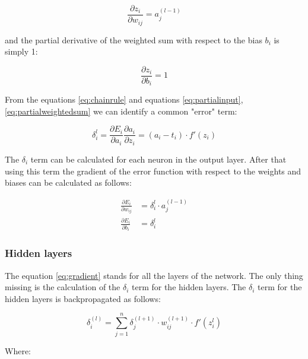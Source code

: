 \begin{equation}
    \label{eq:partialweight}
    \frac{\partial z_i}{\partial w_{ij}} = a_j^{(l-1)}
\end{equation}

and the partial derivative of the weighted sum with respect to the bias $b_i$ is simply 1:

\begin{equation}
    \label{eq:partialbias}
    \frac{\partial z_i}{\partial b_i} = 1
\end{equation}

From the equations \ref{eq:chainrule} and equations \ref{eq:partialinput}, \ref{eq:partialweightedsum} we can identify 
a common "error" term:

\begin{equation}
    \label{eq:errorterm}
    \delta_i^l =  \frac{\partial E_i}{\partial a_i} \frac{\partial a_i}{\partial z_{i}} = (a_i - t_i) \cdot f'(z_i)
\end{equation}

The $\delta_i$ term can be calculated for each neuron in the output layer. After that using this term the gradient of the
error function with respect to the weights and biases can be calculated as follows:

\begin{equation}
    \label{eq:gradient}
    \begin{split}
        \frac{\partial E_i}{\partial w_{ij}} & = \delta_i^l \cdot a_j^{(l-1)} \\
        \frac{\partial E_i}{\partial b_i} & = \delta_i^l
    \end{split}
\end{equation}

\subsubsection{Hidden layers}

The equation \ref{eq:gradient} stands for all the layers of the network. The only thing missing is the calculation of the
$\delta_i$ term for the hidden layers. The $\delta_i$ term for the hidden layers is backpropagated as follows:

\begin{equation}
    \label{eq:backpropagation}
    \delta_i^{(l)} = \sum_{j=1}^{n} \delta_j^{(l+1)} \cdot w_{ij}^{(l+1)} \cdot f'(z_i^{l})
\end{equation}

\noindent
Where:

